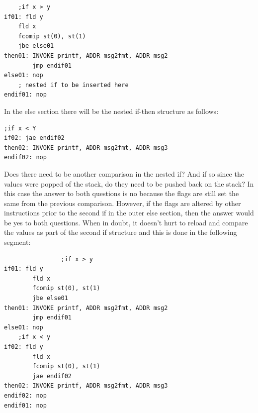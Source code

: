 \documentclass[10pt]{book}
\begin{document}
\begin{verbatim}
    ;if x > y
if01: fld y
    fld x
    fcomip st(0), st(1)
    jbe else01
then01: INVOKE printf, ADDR msg2fmt, ADDR msg2
        jmp endif01
else01: nop
    ; nested if to be inserted here
endif01: nop
\end{verbatim}

In the else section there will be the nested if-then structure as follows:

\begin{verbatim}
;if x < Y
if02: jae endif02
then02: INVOKE printf, ADDR msg2fmt, ADDR msg3
endif02: nop
\end{verbatim}

Does there need to be another comparison in the nested if? And if so since the values were popped of the stack, do they need to be pushed back on the stack? In this case the answer to both questions is no because the flags are still set the same from the previous comparison. However, if the flags are altered by other instructions prior to the second if in the outer else section, then the answer would be yes to both questions. When in doubt, it doesn't hurt to reload and compare the values as part of the second if structure and this is done in the following segment:

\begin{verbatim}
                ;if x > y
if01: fld y
        fld x
        fcomip st(0), st(1)
        jbe else01
then01: INVOKE printf, ADDR msg2fmt, ADDR msg2
        jmp endif01
else01: nop
    ;if x < y
if02: fld y
        fld x
        fcomip st(0), st(1)
        jae endif02
then02: INVOKE printf, ADDR msg2fmt, ADDR msg3
endif02: nop
endif01: nop
\end{verbatim}
\end{document}
